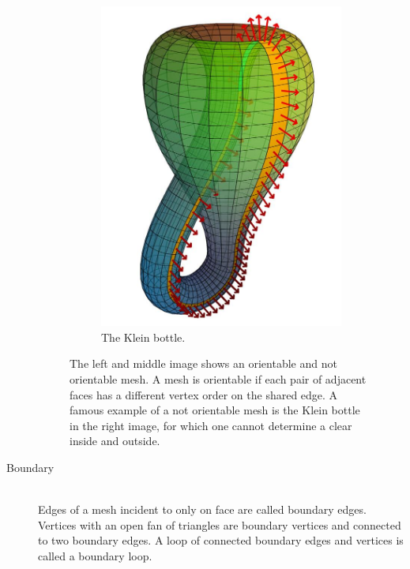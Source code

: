 \begin{description}
\begin{figure}[H]
\begin{subfigure}[b]{0.3\textwidth}
			\includegraphics[width=\textwidth]{images/klein_bottle}
			\caption{The Klein bottle.}
			\label{fig:klein_bottle}
		\end{subfigure}
		\caption{
			The left and middle image shows an orientable and not orientable mesh.
			A mesh is orientable if each pair of adjacent faces has a different vertex order on the shared edge.
			A famous example of a not orientable mesh is the Klein bottle in the right image, for which one cannot determine a clear inside and outside.
		}
		\label{fig:orientable_mesh}
	\end{figure}
	
	
	\item[Boundary] \hfill \\
	Edges of a mesh incident to only on face are called boundary edges.
	Vertices with an open fan of triangles are boundary vertices and connected to two boundary edges.
	A loop of connected boundary edges and vertices is called a boundary loop.
	

\end{description}
